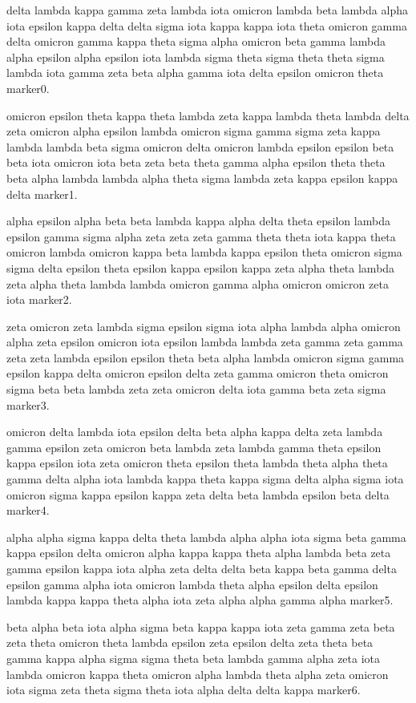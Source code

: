 \documentclass{article}
\begin{document}
delta lambda kappa gamma zeta lambda iota omicron lambda beta lambda alpha iota epsilon kappa delta delta sigma iota kappa kappa iota theta omicron gamma delta omicron gamma kappa theta sigma alpha omicron beta gamma lambda alpha epsilon alpha epsilon iota lambda sigma theta sigma theta theta sigma lambda iota gamma zeta beta alpha gamma iota delta epsilon omicron theta marker0.

omicron epsilon theta kappa theta lambda zeta kappa lambda theta lambda delta zeta omicron alpha epsilon lambda omicron sigma gamma sigma zeta kappa lambda lambda beta sigma omicron delta omicron lambda epsilon epsilon beta beta iota omicron iota beta zeta beta theta gamma alpha epsilon theta theta beta alpha lambda lambda alpha theta sigma lambda zeta kappa epsilon kappa delta marker1.

alpha epsilon alpha beta beta lambda kappa alpha delta theta epsilon lambda epsilon gamma sigma alpha zeta zeta zeta gamma theta theta iota kappa theta omicron lambda omicron kappa beta lambda kappa epsilon theta omicron sigma sigma delta epsilon theta epsilon kappa epsilon kappa zeta alpha theta lambda zeta alpha theta lambda lambda omicron gamma alpha omicron omicron zeta iota marker2.

zeta omicron zeta lambda sigma epsilon sigma iota alpha lambda alpha omicron alpha zeta epsilon omicron iota epsilon lambda lambda zeta gamma zeta gamma zeta zeta lambda epsilon epsilon theta beta alpha lambda omicron sigma gamma epsilon kappa delta omicron epsilon delta zeta gamma omicron theta omicron sigma beta beta lambda zeta zeta omicron delta iota gamma beta zeta sigma marker3.

omicron delta lambda iota epsilon delta beta alpha kappa delta zeta lambda gamma epsilon zeta omicron beta lambda zeta lambda gamma theta epsilon kappa epsilon iota zeta omicron theta epsilon theta lambda theta alpha theta gamma delta alpha iota lambda kappa theta kappa sigma delta alpha sigma iota omicron sigma kappa epsilon kappa zeta delta beta lambda epsilon beta delta marker4.

alpha alpha sigma kappa delta theta lambda alpha alpha iota sigma beta gamma kappa epsilon delta omicron alpha kappa kappa theta alpha lambda beta zeta gamma epsilon kappa iota alpha zeta delta delta beta kappa beta gamma delta epsilon gamma alpha iota omicron lambda theta alpha epsilon delta epsilon lambda kappa kappa theta alpha iota zeta alpha alpha gamma alpha marker5.

beta alpha beta iota alpha sigma beta kappa kappa iota zeta gamma zeta beta zeta theta omicron theta lambda epsilon zeta epsilon delta zeta theta beta gamma kappa alpha sigma sigma theta beta lambda gamma alpha zeta iota lambda omicron kappa theta omicron alpha lambda theta alpha zeta omicron iota sigma zeta theta sigma theta iota alpha delta delta kappa marker6.
\end{document}
